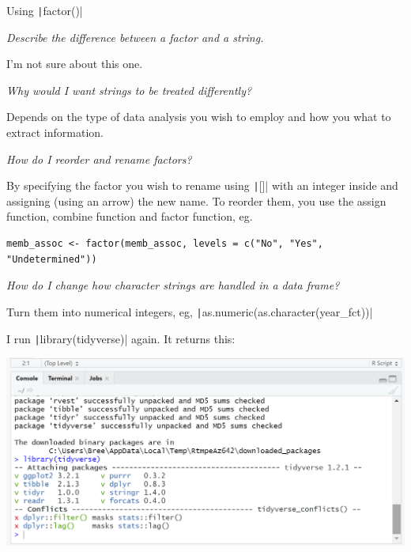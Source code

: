 \documentclass{article}
\begin{document}
Using \texttt|factor()|

\textit{Describe the difference between a factor and a string.}

I'm not sure about this one.

\textit{Why would I want strings to be treated differently?}

Depends on the type of data analysis you wish to employ and how you what to extract information.

\textit{How do I reorder and rename factors?}

By specifying the factor you wish to rename using \texttt|[]| with an integer inside and assigning (using an arrow) the new name. To reorder them, you use the assign function, combine function and factor function, eg.

\begin{verbatim}
memb_assoc <- factor(memb_assoc, levels = c("No", "Yes", "Undetermined"))
\end{verbatim}

\textit{How do I change how character strings are handled in a data frame?}

Turn them into numerical integers, eg, \texttt|as.numeric(as.character(year\_fct))|


I run \texttt|library(tidyverse)| again. It returns this:

\includegraphics[width=1.0\textwidth]{rstudio_14.PNG}
\end{document}
